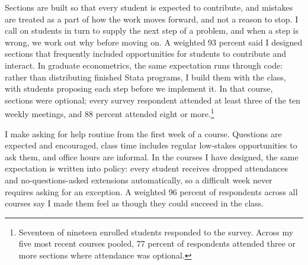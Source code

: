 \documentclass[letter,11pt]{article}
\begin{document}
Sections are built so that every student is expected to contribute, and mistakes are treated as a part of how the work moves forward, and not a reason to stop. I call on students in turn to supply the next step of a problem, and when a step is wrong, we work out why before moving on. A weighted 93 percent said I designed sections that frequently included opportunities for students to contribute and interact. In graduate econometrics, the same expectation runs through code: rather than distributing finished Stata programs, I build them with the class, with students proposing each step before we implement it. In that course, sections were optional; every survey respondent attended at least three of the ten weekly meetings, and 88 percent attended eight or more.\footnote{Seventeen of nineteen enrolled students responded to the survey. Across my five most recent courses pooled, 77 percent of respondents attended three or more sections where attendance was optional.}


I make asking for help routine from the first week of a course. Questions are expected and encouraged, class time includes regular low-stakes opportunities to ask them, and office hours are informal. In the courses I have designed, the same expectation is written into policy: every student receives dropped attendances and no-questions-asked extensions automatically, so a difficult week never requires asking for an exception. A weighted 96 percent of respondents across all courses say I made them feel as though they could succeed in the class.

\end{document}
